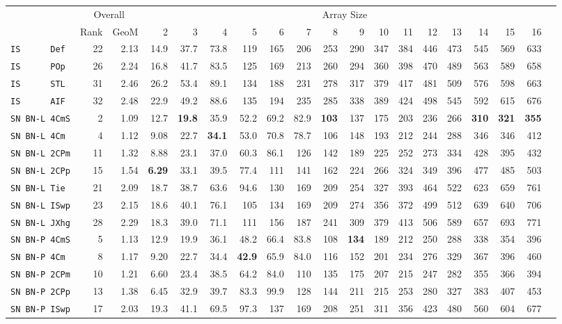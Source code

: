 \begin{tabular}{l | r @{~~} r | r@{~~}r@{~~}r@{~~}r@{~~}r@{~~}r@{~~}r@{~~}r@{~~}r@{~~}r@{~~}r@{~~}r@{~~}r@{~~}r@{~~}r@{~~}r|}
 & \multicolumn{2}{c|}{Overall} & \multicolumn{15}{c}{Array Size} \\
 & Rank & GeoM & 2&3&4&5&6&7&8&9&10&11&12&13&14&15&16\\ \hline
\verb+IS      Def+ & 22 & 2.13 & 14.9&37.7&73.8&119&165&206&253&290&347&384&446&473&545&569&633\\
\verb+IS      POp+ & 26 & 2.24 & 16.8&41.7&83.5&125&169&213&260&294&360&398&470&489&563&589&658\\
\verb+IS      STL+ & 31 & 2.46 & 26.2&53.4&89.1&134&188&231&278&317&379&417&481&509&576&598&663\\
\verb+IS      AIF+ & 32 & 2.48 & 22.9&49.2&88.6&135&194&235&285&338&389&424&498&545&592&615&676\smallskip \\
\verb+SN BN-L 4CmS+ & 2 & 1.09 & 12.7&\textbf{19.8}&35.9&52.2&69.2&82.9&\textbf{103}&137&175&203&236&266&\textbf{310}&\textbf{321}&\textbf{355}\\
\verb+SN BN-L 4Cm + & 4 & 1.12 & 9.08&22.7&\textbf{34.1}&53.0&70.8&78.7&106&148&193&212&244&288&346&346&412\\
\verb+SN BN-L 2CPm+ & 11 & 1.32 & 8.88&23.1&37.0&60.3&86.1&126&142&189&225&252&273&334&428&395&432\\
\verb+SN BN-L 2CPp+ & 15 & 1.54 & \textbf{6.29}&33.1&39.5&77.4&111&141&162&224&266&324&349&396&477&485&503\\
\verb+SN BN-L Tie + & 21 & 2.09 & 18.7&38.7&63.6&94.6&130&169&209&254&327&393&464&522&623&659&761\\
\verb+SN BN-L ISwp+ & 23 & 2.15 & 18.6&40.1&76.1&105&134&169&209&274&356&372&499&512&639&640&706\\
\verb+SN BN-L JXhg+ & 28 & 2.29 & 18.3&39.0&71.1&111&156&187&241&309&379&413&506&589&657&693&771\smallskip \\
\verb+SN BN-P 4CmS+ & 5 & 1.13 & 12.9&19.9&36.1&48.2&66.4&83.8&108&\textbf{134}&189&212&250&288&338&354&396\\
\verb+SN BN-P 4Cm + & 8 & 1.17 & 9.20&22.7&34.4&\textbf{42.9}&65.9&84.0&116&152&201&234&276&329&367&396&460\\
\verb+SN BN-P 2CPm+ & 10 & 1.21 & 6.60&23.4&38.5&64.2&84.0&110&135&175&207&215&247&282&355&366&394\\
\verb+SN BN-P 2CPp+ & 13 & 1.38 & 6.45&32.9&39.7&83.3&99.9&128&144&211&215&253&280&327&383&407&453\\
\verb+SN BN-P ISwp+ & 17 & 2.03 & 19.3&41.1&69.5&97.3&137&169&208&251&311&356&423&480&560&604&677\\

\end{tabular}
